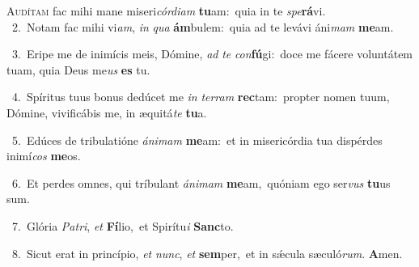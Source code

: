 \lettrine{\initial\textcolor{\initialcolor}{A}}{udítam} fac mihi mane miseri\-\textit{cór}\-\textit{di}\textit{am} \textbf{tu}\-am:~\star quia in te \textit{spe}\-\textbf{rá}vi.\\
{\numbfont\textcolor{\numbcolor}{~2.}}~Notam fac mihi vi\-\textit{am}\-, \textit{in} \textit{qua} \textbf{ám}\-bulem:~\star quia ad te levávi áni\textit{mam} \textbf{me}\-am.\par
{\numbfont\textcolor{\numbcolor}{~3.}}~Eripe me de inimícis meis, Dómine, \textit{ad} \textit{te} \textit{con}\-\textbf{fú}gi:~\star doce me fácere voluntátem tuam, quia Deus me\textit{us} \textbf{es} tu.\par
{\numbfont\textcolor{\numbcolor}{~4.}}~Spíritus tuus bonus dedúcet me \textit{in} \textit{ter}\-\textit{ram} \textbf{rec}\-tam:~\star propter nomen tuum, Dómine, vivificábis me, in æquitá\textit{te} \textbf{tu}\-a.\par
{\numbfont\textcolor{\numbcolor}{~5.}}~Edúces de tribulatióne \textit{á}\-\textit{ni}\textit{mam} \textbf{me}\-am:~\star et in misericórdia tua dispérdes inimí\textit{cos} \textbf{me}\-os.\par
{\numbfont\textcolor{\numbcolor}{~6.}}~Et perdes omnes, qui tríbulant \textit{á}\-\textit{ni}\textit{mam} \textbf{me}\-am,~\star quóniam ego ser\textit{vus} \textbf{tu}\-us sum.\par
{\numbfont\textcolor{\numbcolor}{~7.}}~Glória \textit{Pa}\-\textit{tri}, \textit{et} \textbf{Fí}\-lio,~\star et Spirítu\textit{i} \textbf{Sanc}\-to.\par
{\numbfont\textcolor{\numbcolor}{~8.}}~Sicut erat in princípio, \textit{et} \textit{nunc}\-, \textit{et} \textbf{sem}\-per,~\star et in sǽcula sæculó\-\textit{rum}\-. \textbf{A}\-men.\par
